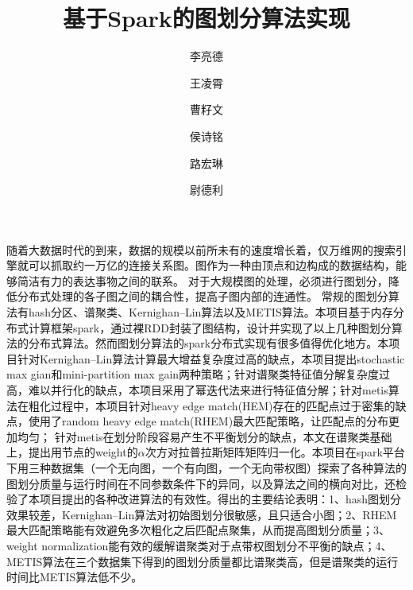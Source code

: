 \documentclass[UTF8,12pt]{ctexart} %
\theoremstyle{definition}
\begin{document}
\title{基于Spark的图划分算法实现}
\author[1]{李亮德}
\author[1]{王凌霄}
\author[2]{曹籽文}
\author[2]{侯诗铭}
\author[2]{路宏琳}
\author[3]{尉德利}
\renewcommand\Authands{, }

\maketitle

\renewcommand{\abstractname}{}
\begin{onecolabstract}
    随着大数据时代的到来，数据的规模以前所未有的速度增长着，仅万维网的搜索引擎就可以抓取约一万亿的连接关系图。图作为一种由顶点和边构成的数据结构，能够简洁有力的表达事物之间的联系。
    对于大规模图的处理，必须进行图划分，降低分布式处理的各子图之间的耦合性，提高子图内部的连通性。
    常规的图划分算法有hash分区、谱聚类、Kernighan–Lin算法以及METIS算法。本项目基于内存分布式计算框架spark，通过裸RDD封装了图结构，设计并实现了以上几种图划分算法的分布式算法。然而图划分算法的spark分布式实现有很多值得优化地方。本项目针对Kernighan–Lin算法计算最大增益复杂度过高的缺点，本项目提出stochastic max gian和mini-partition max gain两种策略；针对谱聚类特征值分解复杂度过高，难以并行化的缺点，本项目采用了幂迭代法来进行特征值分解；针对metis算法在粗化过程中，本项目针对heavy edge match(HEM)存在的匹配点过于密集的缺点，使用了random heavy edge match(RHEM)最大匹配策略，让匹配点的分布更加均匀；
    针对metis在划分阶段容易产生不平衡划分的缺点，本文在谱聚类基础上，提出用节点的weight的$\alpha$次方对拉普拉斯矩阵矩阵归一化。本项目在spark平台下用三种数据集（一个无向图，一个有向图，一个无向带权图）探索了各种算法的图划分质量与运行时间在不同参数条件下的异同，以及算法之间的横向对比，还检验了本项目提出的各种改进算法的有效性。得出的主要结论表明：1、hash图划分效果较差，Kernighan–Lin算法对初始图划分很敏感，且只适合小图；2、RHEM最大匹配策略能有效避免多次粗化之后匹配点聚集，从而提高图划分质量；3、weight normalization能有效的缓解谱聚类对于点带权图划分不平衡的缺点；4、METIS算法在三个数据集下得到的图划分质量都比谱聚类高，但是谱聚类的运行时间比METIS算法低不少。
\end{onecolabstract}

\newpage
\tableofcontents
\newpage





\end{document}

